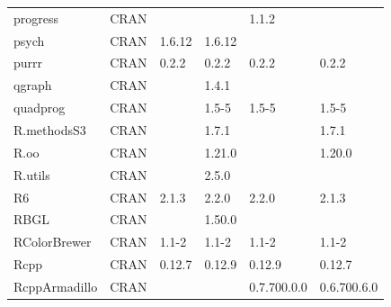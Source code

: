\begin{longtable}{llllll}
\rowcolor{black!10}
progress                      & \acrshort{CRAN}                      &             &             & 1.1.2          &                   \\
\rowcolor{black!5}
psych                         & \acrshort{CRAN}                      & 1.6.12      & 1.6.12      &                &                    \\
\rowcolor{black!10}
purrr                         & \acrshort{CRAN}                      & 0.2.2       & 0.2.2       & 0.2.2          & 0.2.2             \\
\rowcolor{black!5}
qgraph                        & \acrshort{CRAN}                      &             & 1.4.1       &                &                    \\
\rowcolor{black!10}
quadprog                      & \acrshort{CRAN}                      &             & 1.5-5       & 1.5-5          & 1.5-5             \\
\rowcolor{black!5}
R.methodsS3                   & \acrshort{CRAN}                      &             & 1.7.1       &                & 1.7.1              \\
\rowcolor{black!10}
R.oo                          & \acrshort{CRAN}                      &             & 1.21.0      &                & 1.20.0            \\
\rowcolor{black!5}
R.utils                       & \acrshort{CRAN}                      &             & 2.5.0       &                &                    \\
\rowcolor{black!10}
R6                            & \acrshort{CRAN}                      & 2.1.3       & 2.2.0       & 2.2.0          & 2.1.3             \\
\rowcolor{black!5}
RBGL                          & \acrshort{CRAN}                      &             & 1.50.0      &                &                    \\
\rowcolor{black!10}
RColorBrewer                  & \acrshort{CRAN}                      & 1.1-2       & 1.1-2       & 1.1-2          & 1.1-2             \\
\rowcolor{black!5}
Rcpp                          & \acrshort{CRAN}                      & 0.12.7      & 0.12.9      & 0.12.9         & 0.12.7             \\
\rowcolor{black!10}
RcppArmadillo                 & \acrshort{CRAN}                      &             &             & 0.7.700.0.0    & 0.6.700.6.0       \\

\end{longtable}
